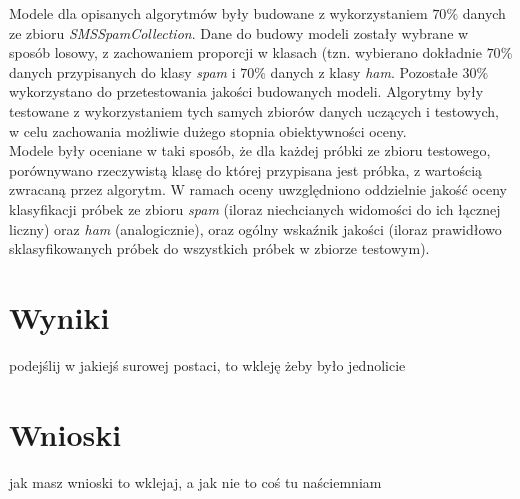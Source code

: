 \documentclass[a4paper,12pt]{article}
\begin{document}
Modele dla opisanych algorytmów były budowane z wykorzystaniem $70\%$ danych ze zbioru \textit{SMSSpamCollection}. Dane do budowy modeli zostały
wybrane w sposób losowy, z zachowaniem proporcji w klasach (tzn. wybierano dokładnie $70\%$ danych przypisanych do klasy \textit{spam} i $70\%$ 
danych z klasy \textit{ham}. Pozostałe $30\%$ wykorzystano do przetestowania jakości budowanych modeli. Algorytmy były testowane z wykorzystaniem
tych samych zbiorów danych uczących i testowych, w celu zachowania możliwie dużego stopnia obiektywności oceny.\\

Modele były oceniane w taki sposób, że dla każdej próbki ze zbioru testowego, porównywano rzeczywistą klasę do której przypisana jest próbka, z
wartością zwracaną przez algorytm. W ramach oceny uwzględniono oddzielnie jakość oceny klasyfikacji próbek ze zbioru \textit{spam} (iloraz niechcianych widomości do ich łącznej liczny) oraz \textit{ham} (analogicznie), oraz ogólny wskaźnik jakości (iloraz prawidłowo sklasyfikowanych próbek do wszystkich próbek w zbiorze testowym).

\section{Wyniki}

podejślij w jakiejś surowej postaci, to wkleję żeby było jednolicie

\section{Wnioski}

jak masz wnioski to wklejaj, a jak nie to coś tu naściemniam
\end{document}
